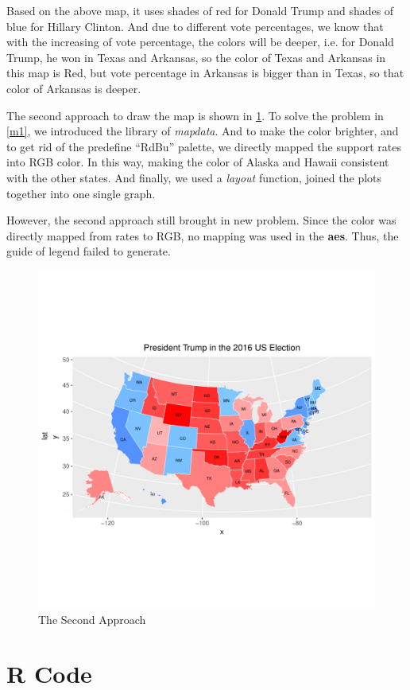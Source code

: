 \documentclass[11pt,letterpaper,titlepage,en-US]{article}
\begin{document}
Based on the above map, it uses shades of red for Donald Trump and shades of blue for Hillary Clinton. And due to different vote percentages, we know that with the increasing of vote percentage, the colors will be deeper, i.e. for Donald Trump, he won in Texas and Arkansas, so the color of Texas and Arkansas in this map is Red, but vote percentage in Arkansas is bigger than in Texas, so that color of Arkansas is deeper.

The second approach to draw the map is shown in \cref{m2}.
To solve the problem in \cref{m1}, we introduced the library of \emph{mapdata}.
And to make the color brighter, and to get rid of the predefine ``RdBu'' palette,
we directly mapped the support rates into RGB color. In this way, making the color
of Alaska and Hawaii consistent with the other states.
And finally, we used a \emph{layout} function, joined the plots together into one
single graph.

However, the second approach still brought in new problem. Since the color was
directly mapped from rates to RGB, no mapping was used in the \textbf{aes}.
Thus, the guide of legend failed to generate.

\begin{figure}[H]
\caption{The Second Approach}\label{m2}
\includegraphics[width=\textwidth]{figure/app2}
\end{figure}


\section{R Code}


\end{document}
